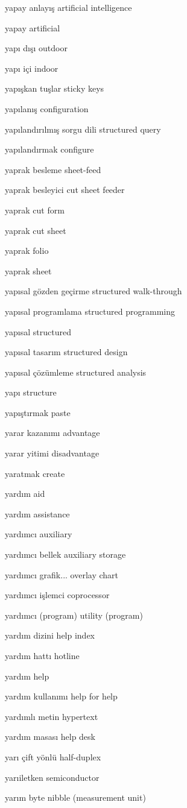 \documentclass[12pt,fleqn]{article}\usepackage{../../common}
\begin{document}
yapay anlayış artificial intelligence

yapay artificial

yapı dışı outdoor

yapı içi indoor

yapışkan tuşlar sticky keys

yapılanış configuration

yapılandırılmış sorgu dili structured query

yapılandırmak configure

yaprak besleme sheet-feed

yaprak besleyici cut sheet feeder

yaprak cut form

yaprak cut sheet

yaprak folio

yaprak sheet

yapısal gözden geçirme structured walk-through

yapısal programlama structured programming

yapısal structured

yapısal tasarım structured design

yapısal çözümleme structured analysis

yapı structure

yapıştırmak paste

yarar kazanımı advantage

yarar yitimi disadvantage

yaratmak create

yardım aid

yardım assistance

yardımcı auxiliary

yardımcı bellek auxiliary storage

yardımcı grafik... overlay chart

yardımcı işlemci coprocessor

yardımcı (program) utility (program)

yardım dizini help index

yardım hattı hotline

yardım help

yardım kullanımı help for help

yardımlı metin hypertext

yardım masası help desk

yarı çift yönlü half-duplex

yarıiletken semiconductor

yarım byte nibble (measurement unit)
\end{document}
